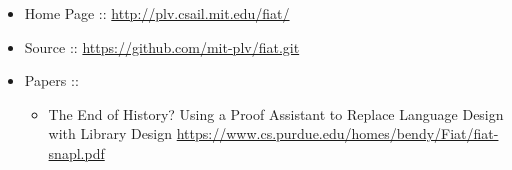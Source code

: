 \documentclass[12pt,twoside]{article}
\begin{document}
\begin{itemize}[noitemsep,topsep=\mdcompacttopsep]%

\item{}Home Page :: \href{http://plv.csail.mit.edu/fiat/}{{\ttfamily http://\hspace{0pt}plv.\hspace{0pt}csail.\hspace{0pt}mit.\hspace{0pt}edu/\hspace{0pt}fiat/\hspace{0pt}}}%

\item{}Source :: \href{https://github.com/mit-plv/fiat.git}{{\ttfamily https://\hspace{0pt}github.\hspace{0pt}com/\hspace{0pt}mit-\hspace{0pt}plv/\hspace{0pt}fiat.\hspace{0pt}git}}%

\item{}Papers ::

\begin{itemize}[noitemsep,topsep=\mdcompacttopsep]%

\item{}The End of History? Using a Proof Assistant to
Replace Language Design with Library Design
\href{https://www.cs.purdue.edu/homes/bendy/Fiat/fiat-snapl.pdf}{{\ttfamily https://\hspace{0pt}www.\hspace{0pt}cs.\hspace{0pt}purdue.\hspace{0pt}edu/\hspace{0pt}homes/\hspace{0pt}bendy/\hspace{0pt}Fiat/\hspace{0pt}fiat-\hspace{0pt}snapl.\hspace{0pt}pdf}}%
\end{itemize}%
\end{itemize}%
\end{document}
